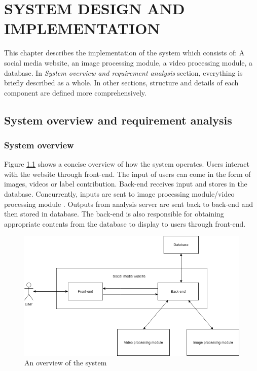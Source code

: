 \chapter{SYSTEM DESIGN AND IMPLEMENTATION}

This chapter describes the implementation of the system which consists of: A social media website, an image processing module, a video processing module, a database. In \textit{System overview and requirement analysis} section, everything is briefly described as a whole. In other sections, structure and details of each component are defined more comprehensively.
\section{System overview and requirement analysis}

\subsection{System overview}
Figure \ref{chap3:system_overview_basic} shows a concise overview of how the system operates. Users interact with the website through front-end. The input of users can come in the form of images, videos or label contribution. Back-end receives input and stores in the database. Concurrently, inputs are sent to image processing module/video processing module . Outputs from analysis server are sent back to back-end and then stored in database. The back-end is also responsible for obtaining appropriate contents from the database to display to users through front-end.

\begin{center}
    \begin{figure}[H]
    \centering
    \includegraphics[width=1\columnwidth]{images/chap3/system_overview_basic.png}
    \caption{An overview of the system}
    \label{chap3:system_overview_basic}
    \end{figure}
\end{center}
